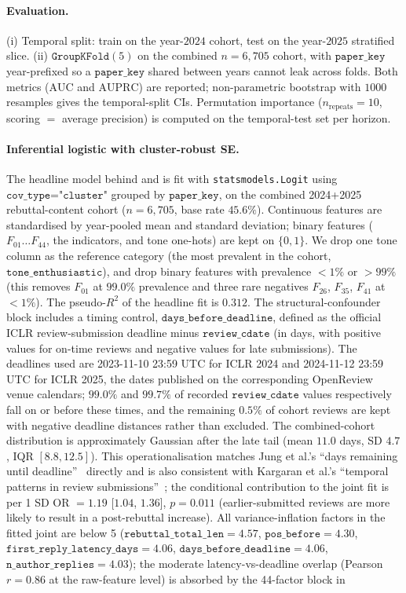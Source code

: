 \documentclass{article}
\newcommand{\code}[1]{\texttt{#1}}
\newcommand{\auc}{\text{AUC}}
\newcommand{\auprc}{\text{AUPRC}}
\begin{document}
\paragraph{Evaluation.} (i) Temporal split: train on the year-$2024$ cohort, test on the year-$2025$ stratified slice. (ii) $\texttt{GroupKFold}(5)$ on the combined $n=6{,}705$ cohort, with $\code{paper\_key}$ year-prefixed so a $\code{paper\_key}$ shared between years cannot leak across folds. Both metrics ($\auc$ and $\auprc$) are reported; non-parametric bootstrap with $1000$ resamples gives the temporal-split CIs. Permutation importance ($n_{\text{repeats}}=10$, scoring $=$ average precision) is computed on the temporal-test set per horizon.

\paragraph{Inferential logistic with cluster-robust SE.} The headline model behind  and  is fit with \code{statsmodels.Logit} using $\code{cov\_type="cluster"}$ grouped by $\code{paper\_key}$, on the combined 2024+2025 rebuttal-content cohort ($n=6{,}705$, base rate $45.6\%$). Continuous features are standardised by year-pooled mean and standard deviation; binary features ($F_{01}\ldots F_{44}$, the indicators, and tone one-hots) are kept on $\{0, 1\}$. We drop one tone column as the reference category (the most prevalent in the cohort, $\code{tone\_enthusiastic}$), and drop binary features with prevalence $<1\%$ or $>99\%$ (this removes $F_{01}$ at $99.0\%$ prevalence and three rare negatives $F_{26}$, $F_{35}$, $F_{41}$ at $<1\%$). The pseudo-$R^2$ of the headline fit is $0.312$. The structural-confounder block includes a timing control, $\code{days\_before\_deadline}$, defined as the official ICLR review-submission deadline minus $\code{review\_cdate}$ (in days, with positive values for on-time reviews and negative values for late submissions). The deadlines used are 2023-11-10 23:59 UTC for ICLR 2024 and 2024-11-12 23:59 UTC for ICLR 2025, the dates published on the corresponding OpenReview venue calendars; $99.0\%$ and $99.7\%$ of recorded $\code{review\_cdate}$ values respectively fall on or before these times, and the remaining $0.5\%$ of cohort reviews are kept with negative deadline distances rather than excluded. The combined-cohort distribution is approximately Gaussian after the late tail (mean $11.0$ days, SD $4.7$, IQR $[8.8, 12.5]$). This operationalisation matches Jung et al.'s ``days remaining until deadline''~\cite{jung} directly and is also consistent with Kargaran et al.'s ``temporal patterns in review submissions''~\cite{kargaran}; the conditional contribution to the joint fit is per 1 SD OR $= 1.19$ [$1.04$, $1.36$], $p = 0.011$ (earlier-submitted reviews are more likely to result in a post-rebuttal increase). All variance-inflation factors in the fitted joint are below 5 ($\code{rebuttal\_total\_len} = 4.57$, $\code{pos\_before} = 4.30$, $\code{first\_reply\_latency\_days} = 4.06$, $\code{days\_before\_deadline} = 4.06$, $\code{n\_author\_replies} = 4.03$); the moderate latency-vs-deadline overlap (Pearson $r = 0.86$ at the raw-feature level) is absorbed by the 44-factor block in 
\end{document}
